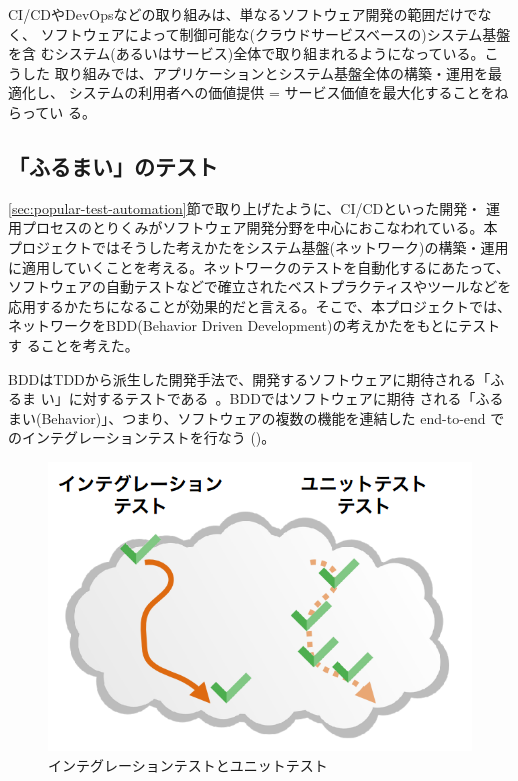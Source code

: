 CI/CDやDevOpsなどの取り組みは、単なるソフトウェア開発の範囲だけでなく、
ソフトウェアによって制御可能な(クラウドサービスベースの)システム基盤を含
むシステム(あるいはサービス)全体で取り組まれるようになっている。こうした
取り組みでは、アプリケーションとシステム基盤全体の構築・運用を最適化し、
システムの利用者への価値提供 = サービス価値を最大化することをねらってい
る。

  \subsection{「ふるまい」のテスト}
  \label{sec:behavior-test}


\ref{sec:popular-test-automation}節で取り上げたように、CI/CDといった開発・
運用プロセスのとりくみがソフトウェア開発分野を中心におこなわれている。本
プロジェクトではそうした考えかたをシステム基盤(ネットワーク)の構築・運用
に適用していくことを考える。ネットワークのテストを自動化するにあたって、
ソフトウェアの自動テストなどで確立されたベストプラクティスやツールなどを
応用するかたちになることが効果的だと言える。そこで、本プロジェクトでは、
ネットワークをBDD(Behavior Driven Development)の考えかたをもとにテストす
ることを考えた。

BDDはTDDから派生した開発手法で、開発するソフトウェアに期待される「ふるま
い」に対するテストである~\cite{wikipedia-bdd}。BDDではソフトウェアに期待
される「ふるまい(Behavior)」、つまり、ソフトウェアの複数の機能を連結した
end-to-end でのインテグレーションテストを行なう
()。

\begin{figure}[h]
 \centering
 \includegraphics[scale=0.6]{img/test-difference.png}
 \caption{インテグレーションテストとユニットテスト}
 \label{fig:test-difference}
\end{figure}

